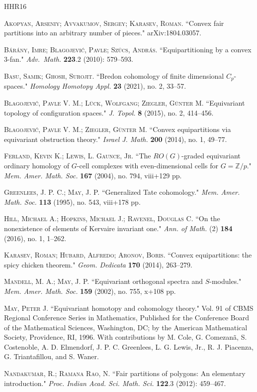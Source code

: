 \documentclass[a4paper,leqno,11pt]{amsart}
\newcommand{\Z}{\mathbb Z}
\theoremstyle{plain}
\theoremstyle{definition}
\theoremstyle{remark}
\begin{document}
\begin{thebibliography}{HHR16}

{\scshape Akopyan, Arseniy; Avvakumov, Sergey; Karasev, Roman.} 
``Convex fair partitions into an arbitrary number of pieces." 
arXiv:1804.03057.

{\scshape Bárány, Imre; Blagojević, Pavle; Szűcs, András.} 
``Equipartitioning by a convex 3-fan." 
\emph{Adv.~Math.} {\bf 223}.2 (2010): 579–593.

{\scshape Basu, Samik; Ghosh, Surojit.} 
``Bredon cohomology of finite dimensional $C_p$-spaces." 
\emph{Homology Homotopy Appl.} {\bf 23} (2021), no. 2, 33–57.

{\scshape Blagojević, Pavle V. M.; Lück, Wolfgang; Ziegler, Günter M.} 
``Equivariant topology of configuration spaces." 
\emph{J. Topol.} {\bf 8} (2015), no. 2, 414–456.

{\scshape Blagojević, Pavle V. M.; Ziegler, Günter M.} 
``Convex equipartitions via equivariant obstruction theory." 
\emph{Israel J. Math.} {\bf 200} (2014), no. 1, 49–77.

{\scshape Ferland, Kevin K.; Lewis, L. Gaunce, Jr.} 
``The $RO(G)$-graded equivariant ordinary homology of $G$-cell complexes with even-dimensional cells for $G=\Z/p$." 
\emph{Mem. Amer. Math. Soc.} {\bf 167} (2004), no. 794, viii+129 pp.

{\scshape Greenlees, J. P. C.; May, J. P.} 
``Generalized Tate cohomology." 
\emph{Mem. Amer. Math. Soc.} {\bf 113} (1995), no. 543, viii+178 pp.

{\scshape Hill, Michael A.; Hopkins, Michael J.; Ravenel, Douglas C.} 
``On the nonexistence of elements of Kervaire invariant one." 
\emph{Ann. of Math.} (2) {\bf 184} (2016), no. 1, 1–262.

{\scshape Karasev, Roman; Hubard, Alfredo; Aronov, Boris.} 
``Convex equipartitions: the spicy chicken theorem." 
\emph{Geom. Dedicata} {\bf 170} (2014), 263–279.


{\scshape Mandell, M. A.; May, J. P.} 
``Equivariant orthogonal spectra and $S$-modules." 
\emph{Mem. Amer. Math. Soc.} {\bf 159} (2002), no. 755, x+108 pp.

{\scshape May, Peter J.} 
``Equivariant homotopy and cohomology theory." 
Vol. 91 of CBMS Regional Conference Series in Mathematics, Published for the Conference Board of the Mathematical Sciences, Washington, DC; by the American Mathematical Society, Providence, RI, 1996. 
With contributions by M. Cole, G. Comezan\~a, S. Costenoble, A. D. Elmendorf, J. P. C. Greenlees, L. G. Lewis, Jr., R. J. Piacenza, G. Triantafillou, and S. Waner.

{\scshape Nandakumar, R.; Ramana Rao, N.} 
``Fair partitions of polygons: An elementary introduction." 
\emph{Proc. Indian Acad. Sci. Math. Sci.} {\bf 122}.3 (2012): 459–467.

\end{thebibliography}
\end{document}
